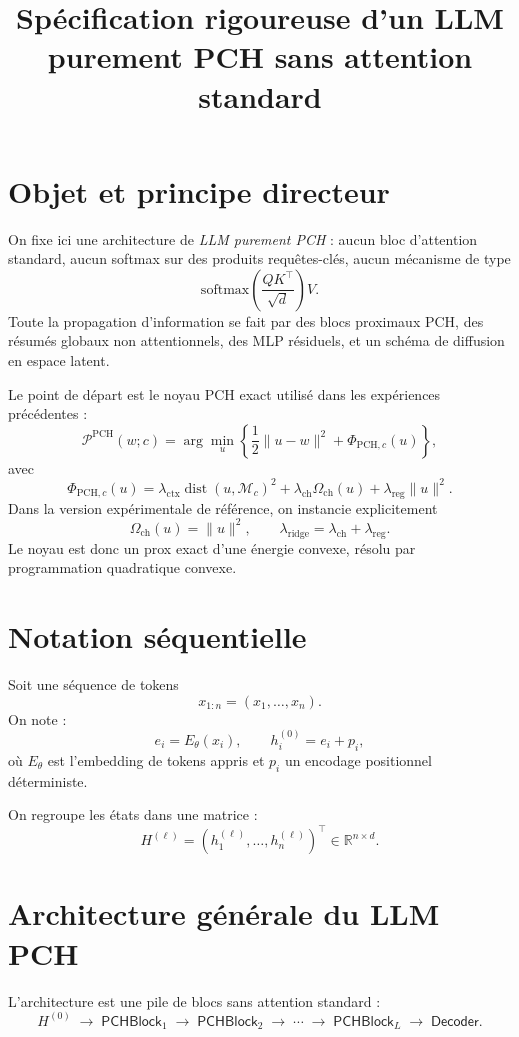 \documentclass[11pt]{article}
\title{Spécification rigoureuse d'un LLM purement PCH sans attention standard}
\author{}
\date{}
\providecommand{\Ppch}{\mathcal P^{\mathrm{PCH}}}
\begin{document}
\maketitle

\section{Objet et principe directeur}

On fixe ici une architecture de \emph{LLM purement PCH} : aucun bloc d'attention standard, aucun softmax sur des produits requêtes-clés, aucun mécanisme de type
\[
\mathrm{softmax}\!\left(\frac{QK^\top}{\sqrt d}\right)V.
\]
Toute la propagation d'information se fait par des blocs proximaux PCH, des résumés globaux non attentionnels, des MLP résiduels, et un schéma de diffusion en espace latent.

Le point de départ est le noyau PCH exact utilisé dans les expériences précédentes :
\[
\Ppch(w;c)
=
\arg\min_u
\left\{
\frac12\|u-w\|^2+\Phi_{\mathrm{PCH},c}(u)
\right\},
\]
avec
\[
\Phi_{\mathrm{PCH},c}(u)
=
\lambda_{\mathrm{ctx}}\operatorname{dist}(u,\mathcal M_c)^2
+
\lambda_{\mathrm{ch}}\Omega_{\mathrm{ch}}(u)
+
\lambda_{\mathrm{reg}}\|u\|^2.
\]
Dans la version expérimentale de référence, on instancie explicitement
\[
\Omega_{\mathrm{ch}}(u)=\|u\|^2,
\qquad
\lambda_{\mathrm{ridge}}=\lambda_{\mathrm{ch}}+\lambda_{\mathrm{reg}}.
\]
Le noyau est donc un prox exact d'une énergie convexe, résolu par programmation quadratique convexe.

\section{Notation séquentielle}

Soit une séquence de tokens
\[
x_{1:n}=(x_1,\dots,x_n).
\]
On note :
\[
e_i = E_{\theta}(x_i),\qquad
h_i^{(0)} = e_i + p_i,
\]
où \(E_\theta\) est l'embedding de tokens appris et \(p_i\) un encodage positionnel déterministe.

On regroupe les états dans une matrice :
\[
H^{(\ell)} = (h_1^{(\ell)},\dots,h_n^{(\ell)})^\top \in \mathbb R^{n\times d}.
\]

\section{Architecture générale du LLM PCH}

L'architecture est une pile de blocs sans attention standard :
\[
H^{(0)}
\;\longrightarrow\;
\mathsf{PCHBlock}_1
\;\longrightarrow\;
\mathsf{PCHBlock}_2
\;\longrightarrow\;\cdots\;\longrightarrow\;
\mathsf{PCHBlock}_L
\;\longrightarrow\;
\mathsf{Decoder}.
\]
\end{document}
